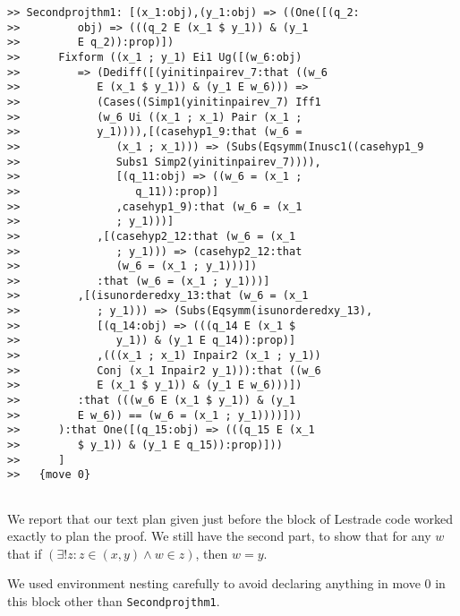 \documentclass[12pt]{article}
\begin{document}
\begin{verbatim}
>> Secondprojthm1: [(x_1:obj),(y_1:obj) => ((One([(q_2:
>>         obj) => (((q_2 E (x_1 $ y_1)) & (y_1
>>         E q_2)):prop)])
>>      Fixform ((x_1 ; y_1) Ei1 Ug([(w_6:obj)
>>         => (Dediff([(yinitinpairev_7:that ((w_6
>>            E (x_1 $ y_1)) & (y_1 E w_6))) =>
>>            (Cases((Simp1(yinitinpairev_7) Iff1
>>            (w_6 Ui ((x_1 ; x_1) Pair (x_1 ;
>>            y_1)))),[(casehyp1_9:that (w_6 =
>>               (x_1 ; x_1))) => (Subs(Eqsymm(Inusc1((casehyp1_9
>>               Subs1 Simp2(yinitinpairev_7)))),
>>               [(q_11:obj) => ((w_6 = (x_1 ;
>>                  q_11)):prop)]
>>               ,casehyp1_9):that (w_6 = (x_1
>>               ; y_1)))]
>>            ,[(casehyp2_12:that (w_6 = (x_1
>>               ; y_1))) => (casehyp2_12:that
>>               (w_6 = (x_1 ; y_1)))])
>>            :that (w_6 = (x_1 ; y_1)))]
>>         ,[(isunorderedxy_13:that (w_6 = (x_1
>>            ; y_1))) => (Subs(Eqsymm(isunorderedxy_13),
>>            [(q_14:obj) => (((q_14 E (x_1 $
>>               y_1)) & (y_1 E q_14)):prop)]
>>            ,(((x_1 ; x_1) Inpair2 (x_1 ; y_1))
>>            Conj (x_1 Inpair2 y_1))):that ((w_6
>>            E (x_1 $ y_1)) & (y_1 E w_6)))])
>>         :that (((w_6 E (x_1 $ y_1)) & (y_1
>>         E w_6)) == (w_6 = (x_1 ; y_1))))]))
>>      ):that One([(q_15:obj) => (((q_15 E (x_1
>>         $ y_1)) & (y_1 E q_15)):prop)]))
>>      ]
>>   {move 0}


\end{verbatim}

We report that our text plan given just before the block of Lestrade code worked exactly to plan the proof.  We still have the second part, to show that for any $w$ that if $(\exists! z: z \in (x,y) \wedge w \in z)$, then $w=y$.

We used environment nesting carefully to avoid declaring anything in move 0 in this block other than {\tt Secondprojthm1}.
\end{document}
